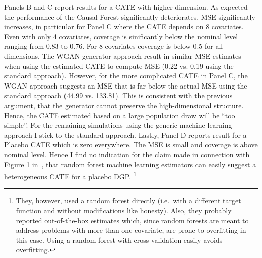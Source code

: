 \documentclass[11pt, a4paper, leqno]{article}
\begin{document}
Panels B and C report results for a CATE with higher dimension. As expected the performance of the Causal Forest significantly deteriorates.
MSE significantly increases, in particular for Panel C where the CATE depends on 8 covariates.
Even with only 4 covariates, coverage is sinificantly below the nominal level ranging from 0.83 to 0.76. For 8 covariates coverage is below 0.5 for all dimensions.
The WGAN generator approach result in similar MSE estimates when using the estimated CATE to compute MSE (0.22 vs. 0.19 using the standard approach).
However, for the more complicated CATE in Panel C, the WGAN approach suggests an MSE that is far below the actual MSE using the standard approach (44.99 vs. 133.81).
This is consistent with the previous argument, that the generator cannot preserve the high-dimensional structure. Hence, the CATE estimated based on a large population draw will be ``too simple''.
For the remaining simulations using the generic machine learning approach I stick to the standard approach.
Lastly, Panel D reports result for a Placebo CATE which is zero everywhere. The MSE is small and coverage is above nominal level.
Hence I find no indication for the claim made in connection with Figure 1 in~\citet{chernozhukov2023genml}, that random forest machine learning estimators can easily suggest a heterogeneous CATE for a placebo DGP\@.
\footnote{They, however, used a random forest directly (i.e.\ with a different target function and without modifications like honesty). Also, they probably reported out-of-the-box estimates which, since random forests are meant to address problems with more than one covariate, are prone to overfitting in this case. Using a random forest with cross-validation easily avoids overfitting.}
\end{document}
